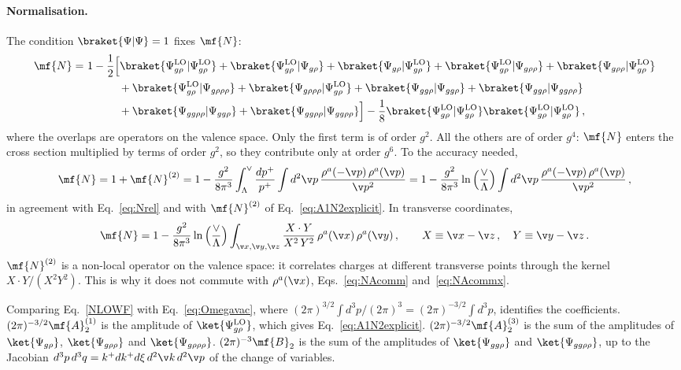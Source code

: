 \paragraph{Normalisation.}
The condition $\braket{\Psi|\Psi}=1$ fixes $\mf{N}$:
\begin{align}\label{eq:Ncondition}
\mf{N} =\ &1-\frac{1}{2}\Big[\braket{\Psi^{\rm LO}_{g\rho}|\Psi^{\rm LO}_{g\rho}}
+\braket{\Psi^{\rm LO}_{g\rho}|\Psi_{g\rho}}+\braket{\Psi_{g\rho}|\Psi^{\rm LO}_{g\rho}}
+\braket{\Psi^{\rm LO}_{g\rho}|\Psi_{g\rho\rho}}+\braket{\Psi_{g\rho\rho}|\Psi^{\rm LO}_{g\rho}}\notag\\
&\hspace{1cm}+\braket{\Psi^{\rm LO}_{g\rho}|\Psi_{g\rho\rho\rho}}+\braket{\Psi_{g\rho\rho\rho}|\Psi^{\rm LO}_{g\rho}}
+\braket{\Psi_{gg\rho}|\Psi_{gg\rho}}+\braket{\Psi_{gg\rho}|\Psi_{gg\rho\rho}}\notag\\
&\hspace{1cm}+\braket{\Psi_{gg\rho\rho}|\Psi_{gg\rho}}+\braket{\Psi_{gg\rho\rho}|\Psi_{gg\rho\rho}}\Big]
-\frac{1}{8}\braket{\Psi^{\rm LO}_{g\rho}|\Psi^{\rm LO}_{g\rho}}\braket{\Psi^{\rm LO}_{g\rho}|\Psi^{\rm LO}_{g\rho}}\,,
\end{align}
where the overlaps are operators on the valence space. Only the first term is of order $g^{2}$. All the
others are of order $g^{4}$: $\mf{N}$ enters the cross section multiplied by terms of order $g^{2}$, so
they contribute only at order $g^{6}$. To the accuracy needed,
\begin{align}\label{eq:Nmom}
\mf{N}=1+\mf{N}^{(2)}
=1-\frac{g^{2}}{8\pi^{3}}\int_{\Lambda}^{\vee}\frac{dp^{+}}{p^{+}}\int d^{2}\v p\,\frac{\rho^{a}(-\v p)\,\rho^{a}(\v p)}{\v p^{2}}
=1-\frac{g^{2}}{8\pi^{3}}\ln\Big(\frac{\vee}{\Lambda}\Big)\int d^{2}\v p\,\frac{\rho^{a}(-\v p)\,\rho^{a}(\v p)}{\v p^{2}}\,,
\end{align}
in agreement with Eq.~\eqref{eq:Nrel} and with $\mf{N}^{(2)}$ of Eq.~\eqref{eq:A1N2explicit}. In transverse
coordinates,
\begin{align}\label{eq:Npos}
\mf{N}=1-\frac{g^{2}}{8\pi^{3}}\ln\Big(\frac{\vee}{\Lambda}\Big)\int_{\v x,\v y,\v z}
\frac{X\cdot Y}{X^{2}\,Y^{2}}\,\rho^{a}(\v x)\,\rho^{a}(\v y)\,,\qquad X\equiv\v x-\v z\,,\quad Y\equiv\v y-\v z\,.
\end{align}
$\mf{N}^{(2)}$ is a non-local operator on the valence space: it correlates charges at different transverse
points through the kernel $X\cdot Y/(X^{2}Y^{2})$. This is why it does not commute with $\rho^{a}(\v x)$,
Eqs.~\eqref{eq:NAcomm} and~\eqref{eq:NAcommx}.

Comparing Eq.~\eqref{NLOWF} with Eq.~\eqref{eq:Omegavac}, where
$(2\pi)^{3/2}\int d^{3}p/(2\pi)^{3}=(2\pi)^{-3/2}\int d^{3}p$, identifies the coefficients.
$(2\pi)^{-3/2}\mf{A}^{(1)}_{2}$ is the amplitude of $\ket{\Psi^{\rm LO}_{g\rho}}$, which gives
Eq.~\eqref{eq:A1N2explicit}. $(2\pi)^{-3/2}\mf{A}^{(3)}_{2}$ is the sum of the amplitudes of
$\ket{\Psi_{g\rho}}$, $\ket{\Psi_{g\rho\rho}}$ and $\ket{\Psi_{g\rho\rho\rho}}$. $(2\pi)^{-3}\mf{B}_{2}$ is the sum of
the amplitudes of $\ket{\Psi_{gg\rho}}$ and $\ket{\Psi_{gg\rho\rho}}$, up to the Jacobian
$d^{3}p\,d^{3}q=k^{+}dk^{+}d\xi\,d^{2}\v k\,d^{2}\v p$ of the change of variables.
